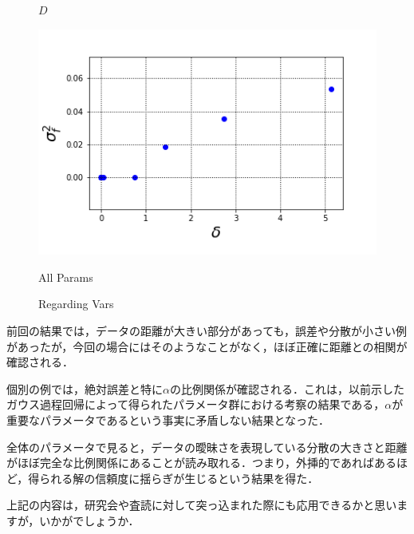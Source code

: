 \documentclass[16.7pt]{jsarticle}
\begin{document}
\begin{figure}[h]
\begin{minipage}{0.45\hsize}
				\caption{$ D $}
			\end{minipage}
			\begin{minipage}{0.45\hsize}
				\centering
				\includegraphics[width= 0.85\columnwidth]{./figure/ERR_VARS.png}
				\caption{All Params}
			\end{minipage}
			\caption{Regarding Vars}
		\end{figure}
	前回の結果では，データの距離が大きい部分があっても，誤差や分散が小さい例があったが，今回の場合にはそのようなことがなく，ほぼ正確に距離との相関が確認される．
	
	個別の例では，絶対誤差と特に$ \alpha $の比例関係が確認される．これは，以前示したガウス過程回帰によって得られたパラメータ群における考察の結果である，$ \alpha $が重要なパラメータであるという事実に矛盾しない結果となった．
	
	全体のパラメータで見ると，データの曖昧さを表現している分散の大きさと距離がほぼ完全な比例関係にあることが読み取れる．つまり，外挿的であればあるほど，得られる解の信頼度に揺らぎが生じるという結果を得た．
	
	上記の内容は，研究会や査読に対して突っ込まれた際にも応用できるかと思いますが，いかがでしょうか．
	
\end{document}
